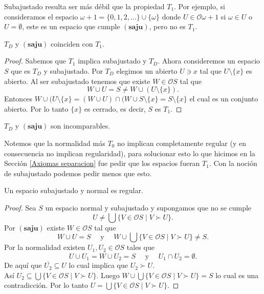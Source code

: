 Subajustado resulta ser más débil que la propiedad $T_1$. Por ejemplo, si consideramos el espacio $\omega +1=\{0, 1, 2, \dots \}\cup \{\omega\}$ donde $U\in \mathcal{O}\omega +1$ si $\omega\in U$ o $U=\emptyset$, este es un espacio que cumple $(\mathbf{saju})$, pero no es $T_1$.

\begin{prop}
    $T_D$ y $(\mathbf{saju})$ coinciden con $T_1$.
\end{prop}

\begin{proof}
    Sabemos que $T_1$ implica subajustado y $T_D$. Ahora consideremos un espacio $S$ que es $T_D$ y subajustado. Por $T_D$ elegimos un abierto $U\ni x$ tal que $U\setminus \{x\}$ es abierto. Al ser subajustado tenemos que existe $W\in \mathcal{O}S$ tal que 
    \[
    W\cup U=S\neq W\cup (U\setminus \{x\}).
    \]
    Entonces $W\cup (U\setminus\{x\}=(W\cup U)\cap (W\cup S\setminus\{x\}=S\setminus\{x\}$ el cual es un conjunto abierto. Por lo tanto $\{x\}$ es cerrado, es decir, $S$ es $T_1$.
\end{proof}

\begin{cor}
    $T_D$ y $(\mathbf{saju})$ son incomparables.
\end{cor}

Notemos que la normalidad más $T_0$ no implican completamente regular (y en consecuencia no implican regularidad), para solucionar esto lo que hicimos en la Sección \ref{Axiomas separacion} fue pedir que los espacios fueran $T_1$. Con la noción de subajustado podemos pedir menos que esto.

\begin{prop}
    Un espacio subajustado y normal es regular.
\end{prop}

\begin{proof}
    Sea $S$ un espacio normal y subajustado y supongamos que no se cumple 
    \[
    U\neq \bigcup\{V\in \mathcal{O}S\mid V\succ U\}.
    \]
    Por $(\mathbf{saju})$ existe $W\in\mathcal{O}S$ tal que 
    \[
    W\cup U=S\quad\mbox{ y }\quad W\cup \bigcup\{V\in \mathcal{O}S\mid V\succ U\}\neq S.
    \]
    Por la normalidad existen $U_1, U_2\in \mathcal{O}S$ tales que 
    \[
    U\cup U_1=W\cup U_2=S\quad\mbox{ y }\quad U_1\cap U_2=\emptyset.
    \]
    De aquí que $\overline{U_2}\subseteq U$ lo cual implica que $U_2\succ U$. \\
    
    \noindent
    Así $U_2\subseteq\bigcup\{V\in \mathcal{O}S\mid V\succ U\}$. Luego $W\cup\bigcup\{V\in \mathcal{O}S\mid V\succ U\}=S$ lo cual es una contradicción. Por lo tanto $U=\bigcup\{V\in \mathcal{O}S\mid V\succ U\}$.
    \end{proof}
    

